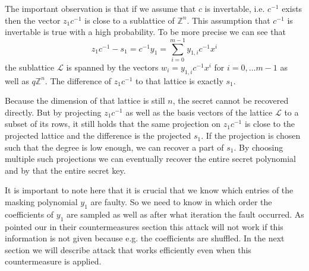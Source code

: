 \documentclass[a4paper,titlepage]{article}
\begin{document}
The important observation is that if we assume that $c$ is invertable, i.e. $c^{-1}$ exists then the vector $z_1 c^{-1}$ is close to a sublattice of $\mathds{Z}^n$. This assumption that $c^{-1}$ is invertable is true with a high probability. To be more precise we can see that
\[
z_1 c^{-1} - s_1 = c^{-1} y_1 = \sum_{i = 0}^{m-1}y_{1,i}c^{-1}x^i
\]
the sublattice $\mathcal{L}$ is spanned by the vectors $w_i = y_{1,i}c^{-1}x^i$ for $i = 0, \ldots m - 1$ as well as $q\mathds{Z}^n$. The difference of $z_1 c^{-1}$ to that lattice is exactly $s_1$.

Because the dimension of that lattice is still $n$, the secret cannot be recovered directly. But by projecting $z_1 c^{-1}$ as well as the basis vectors of the lattice $\mathcal{L}$ to a subset of its rows, it still holds that the same projection on $z_1 c^{-1}$ is close to the projected lattice and the difference is the projected $s_1$. If the projection is chosen such that the degree is low enough, we can recover a part of $s_1$.  By choosing multiple such projections  we can eventually recover the entire secret polynomial and by that the entire secret key.

It is important to note here that it is crucial that we know which entries of the masking polynomial $y_1$ are faulty. So we need to know in which order the coefficients of $y_1$ are sampled as well as after what iteration the fault occurred. As pointed our in their countermeasures section this attack will not work if this information is not given because e.g. the coefficients are shuffled. In the next section we will describe attack that works efficiently even when this countermeasure is applied.
\end{document}
